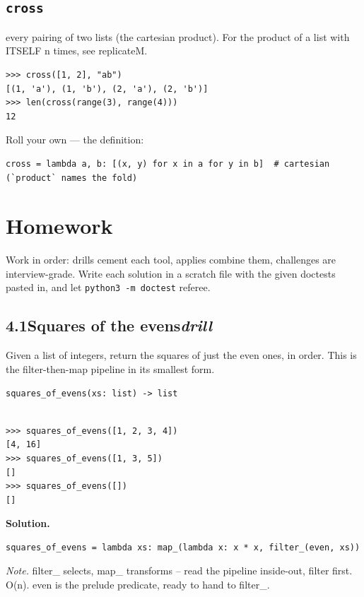 \documentclass[10pt,letterpaper]{book}
\begin{document}
\subsection{\texttt{cross}}\label{def:cross}
every pairing of two lists (the cartesian product). For the product of a list with ITSELF n times, see replicateM.
\begin{lstlisting}[style=ex]
>>> cross([1, 2], "ab")
[(1, 'a'), (1, 'b'), (2, 'a'), (2, 'b')]
>>> len(cross(range(3), range(4)))
12
\end{lstlisting}

Roll your own --- the definition:

\begin{lstlisting}[style=ex]
cross = lambda a, b: [(x, y) for x in a for y in b]  # cartesian (`product` names the fold)
\end{lstlisting}

\section{Homework}
Work in order: drills cement each tool, applies combine them,
challenges are interview-grade. Write each solution in a scratch file with
the given doctests pasted in, and let \texttt{python3 -m doctest} referee.
\subsection*{4.1\quad Squares of the evens\hfill\textnormal{\textit{drill}}}
Given a list of integers, return the squares of just the even ones, in order. This is the filter-then-map pipeline in its smallest form.

\noindent\texttt{squares\_of\_evens(xs: list) -> list}
\begin{lstlisting}[style=ex]

>>> squares_of_evens([1, 2, 3, 4])
[4, 16]
>>> squares_of_evens([1, 3, 5])
[]
>>> squares_of_evens([])
[]

\end{lstlisting}
\noindent\textbf{Solution.}
\begin{lstlisting}[style=code]
squares_of_evens = lambda xs: map_(lambda x: x * x, filter_(even, xs))
\end{lstlisting}
\noindent\textit{Note.} filter\_ selects, map\_ transforms -- read the pipeline inside-out, filter first. O(n). even is the prelude predicate, ready to hand to filter\_.
\end{document}
